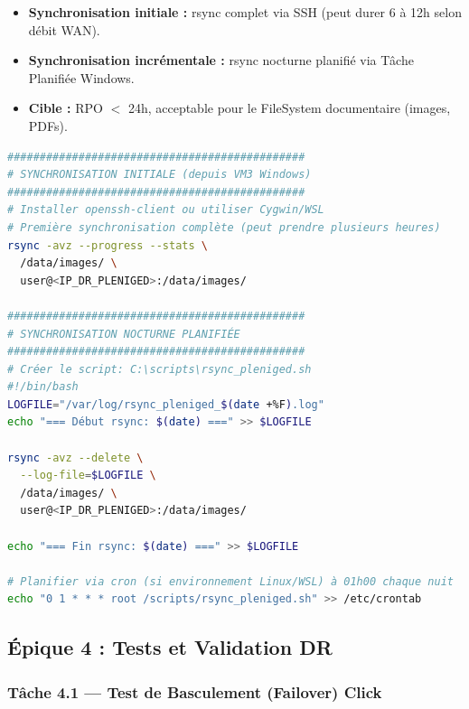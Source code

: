 \documentclass[a4paper,11pt]{article}
\newenvironment{infobox}[1][Information]{%
  \begin{tcolorbox}[colback=zoneblue, colframe=bnmlightblue, fonttitle=\bfseries, title=#1]
}{%
  \end{tcolorbox}
}
\begin{document}
\begin{infobox}[Stratégie FS Pleniged — 4 TB d'images et PDFs]
\begin{itemize}[noitemsep]
  \item \textbf{Synchronisation initiale :} rsync complet via SSH (peut durer 6 à 12h selon débit WAN).
  \item \textbf{Synchronisation incrémentale :} rsync nocturne planifié via Tâche Planifiée Windows.
  \item \textbf{Cible :} RPO $<$ 24h, acceptable pour le FileSystem documentaire (images, PDFs).
\end{itemize}
\end{infobox}

\begin{lstlisting}[language=bash, caption={Synchronisation initiale FS Pleniged et planification nocturne}]
##############################################
# SYNCHRONISATION INITIALE (depuis VM3 Windows)
##############################################
# Installer openssh-client ou utiliser Cygwin/WSL
# Première synchronisation complète (peut prendre plusieurs heures)
rsync -avz --progress --stats \
  /data/images/ \
  user@<IP_DR_PLENIGED>:/data/images/

##############################################
# SYNCHRONISATION NOCTURNE PLANIFIÉE
##############################################
# Créer le script: C:\scripts\rsync_pleniged.sh
#!/bin/bash
LOGFILE="/var/log/rsync_pleniged_$(date +%F).log"
echo "=== Début rsync: $(date) ===" >> $LOGFILE

rsync -avz --delete \
  --log-file=$LOGFILE \
  /data/images/ \
  user@<IP_DR_PLENIGED>:/data/images/

echo "=== Fin rsync: $(date) ===" >> $LOGFILE

# Planifier via cron (si environnement Linux/WSL) à 01h00 chaque nuit
echo "0 1 * * * root /scripts/rsync_pleniged.sh" >> /etc/crontab
\end{lstlisting}

\subsection{Épique 4 : Tests et Validation DR}

\subsubsection{Tâche 4.1 — Test de Basculement (Failover) Click}
\end{document}
